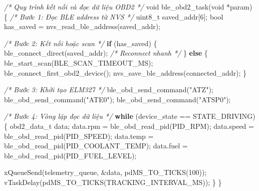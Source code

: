 \documentclass[13pt,a4paper]{extarticle}
\newenvironment{Shaded}{}{}
\newcommand{\CommentTok}[1]{\textcolor[rgb]{0.38,0.63,0.69}{\textit{#1}}}
\newcommand{\ControlFlowTok}[1]{\textcolor[rgb]{0.00,0.44,0.13}{\textbf{#1}}}
\newcommand{\DataTypeTok}[1]{\textcolor[rgb]{0.56,0.13,0.00}{#1}}
\newcommand{\DecValTok}[1]{\textcolor[rgb]{0.25,0.63,0.44}{#1}}
\newcommand{\NormalTok}[1]{#1}
\newcommand{\OperatorTok}[1]{\textcolor[rgb]{0.40,0.40,0.40}{#1}}
\newcommand{\StringTok}[1]{\textcolor[rgb]{0.25,0.44,0.63}{#1}}
\renewcommand{\\}{\thesislongtableorignewline\hline}%
\begin{document}
\begin{Shaded}
\begin{Highlighting}[]
\CommentTok{/* Quy trình kết nối và đọc dữ liệu OBD2 */}
\DataTypeTok{void}\NormalTok{ ble\_obd2\_task}\OperatorTok{(}\DataTypeTok{void} \OperatorTok{*}\NormalTok{param}\OperatorTok{)} \OperatorTok{\{}
    \CommentTok{/* Bước 1: Đọc BLE address từ NVS */}
    \DataTypeTok{uint8\_t}\NormalTok{ saved\_addr}\OperatorTok{[}\DecValTok{6}\OperatorTok{];}
    \DataTypeTok{bool}\NormalTok{ has\_saved }\OperatorTok{=}\NormalTok{ nvs\_read\_ble\_address}\OperatorTok{(}\NormalTok{saved\_addr}\OperatorTok{);}

    \CommentTok{/* Bước 2: Kết nối hoặc scan */}
    \ControlFlowTok{if} \OperatorTok{(}\NormalTok{has\_saved}\OperatorTok{)} \OperatorTok{\{}
\NormalTok{        ble\_connect\_direct}\OperatorTok{(}\NormalTok{saved\_addr}\OperatorTok{);}  \CommentTok{/* Reconnect nhanh */}
    \OperatorTok{\}} \ControlFlowTok{else} \OperatorTok{\{}
\NormalTok{        ble\_start\_scan}\OperatorTok{(}\NormalTok{BLE\_SCAN\_TIMEOUT\_MS}\OperatorTok{);}
\NormalTok{        ble\_connect\_first\_obd2\_device}\OperatorTok{();}
\NormalTok{        nvs\_save\_ble\_address}\OperatorTok{(}\NormalTok{connected\_addr}\OperatorTok{);}
    \OperatorTok{\}}

    \CommentTok{/* Bước 3: Khởi tạo ELM327 */}
\NormalTok{    ble\_obd\_send\_command}\OperatorTok{(}\StringTok{"ATZ"}\OperatorTok{);}
\NormalTok{    ble\_obd\_send\_command}\OperatorTok{(}\StringTok{"ATE0"}\OperatorTok{);}
\NormalTok{    ble\_obd\_send\_command}\OperatorTok{(}\StringTok{"ATSP0"}\OperatorTok{);}

    \CommentTok{/* Bước 4: Vòng lặp đọc dữ liệu */}
    \ControlFlowTok{while} \OperatorTok{(}\NormalTok{device\_state }\OperatorTok{==}\NormalTok{ STATE\_DRIVING}\OperatorTok{)} \OperatorTok{\{}
\NormalTok{        obd2\_data\_t data}\OperatorTok{;}
\NormalTok{        data}\OperatorTok{.}\NormalTok{rpm   }\OperatorTok{=}\NormalTok{ ble\_obd\_read\_pid}\OperatorTok{(}\NormalTok{PID\_RPM}\OperatorTok{);}
\NormalTok{        data}\OperatorTok{.}\NormalTok{speed }\OperatorTok{=}\NormalTok{ ble\_obd\_read\_pid}\OperatorTok{(}\NormalTok{PID\_SPEED}\OperatorTok{);}
\NormalTok{        data}\OperatorTok{.}\NormalTok{temp  }\OperatorTok{=}\NormalTok{ ble\_obd\_read\_pid}\OperatorTok{(}\NormalTok{PID\_COOLANT\_TEMP}\OperatorTok{);}
\NormalTok{        data}\OperatorTok{.}\NormalTok{fuel  }\OperatorTok{=}\NormalTok{ ble\_obd\_read\_pid}\OperatorTok{(}\NormalTok{PID\_FUEL\_LEVEL}\OperatorTok{);}

\NormalTok{        xQueueSend}\OperatorTok{(}\NormalTok{telemetry\_queue}\OperatorTok{,} \OperatorTok{\&}\NormalTok{data}\OperatorTok{,}\NormalTok{ pdMS\_TO\_TICKS}\OperatorTok{(}\DecValTok{100}\OperatorTok{));}
\NormalTok{        vTaskDelay}\OperatorTok{(}\NormalTok{pdMS\_TO\_TICKS}\OperatorTok{(}\NormalTok{TRACKING\_INTERVAL\_MS}\OperatorTok{));}
    \OperatorTok{\}}
\OperatorTok{\}}
\end{Highlighting}
\end{Shaded}
\end{document}
